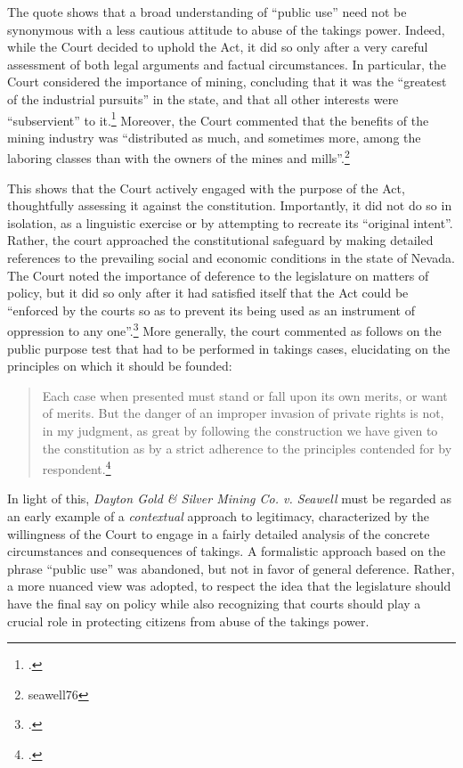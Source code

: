 The quote shows that a broad understanding of ``public use'' need not be synonymous with a less cautious attitude to abuse of the takings power. Indeed, while the Court decided to uphold the Act, it did so only after a very careful assessment of both legal arguments and factual circumstances. In particular, the Court considered the importance of mining, concluding that it was the ``greatest of the industrial pursuits'' in the state, and that all other interests were ``subservient'' to it.\footcite[409]{seawell76} Moreover, the Court commented that the benefits of the mining industry was ``distributed as much, and sometimes more, among the laboring classes than with the owners of the mines and mills''.\footnote[409]{seawell76}

This shows that the Court actively engaged with the purpose of the Act, thoughtfully assessing it against the constitution. Importantly, it did not do so in isolation, as a linguistic exercise or by attempting to recreate its ``original intent''. Rather, the court approached the constitutional safeguard by making detailed references to the prevailing social and economic conditions in the state of Nevada. The Court noted the importance of deference to the legislature on matters of policy, but it did so only after it had satisfied itself that the Act could be ``enforced by the courts so as to prevent its being used as an instrument of oppression to any one''.\footcite[412]{seawell76} More generally, the court commented as follows on the public purpose test that had to be performed in takings cases, elucidating on the principles on which it should be founded:

\begin{quote}
 Each case when presented must stand or fall upon its own merits, or want of merits. But the danger of an improper invasion of private rights is not, in my judgment, as great by following the construction we have given to the constitution as by a strict adherence to the principles contended for by respondent.\footcite[398]{seawell76}
\end{quote}

In light of this, {\it Dayton Gold \& Silver Mining Co. v. Seawell} must be regarded as an early example of a {\it contextual} approach to legitimacy, characterized by the willingness of the Court to engage in a fairly detailed analysis of the concrete circumstances and consequences of takings. A formalistic approach based on the phrase ``public use'' was abandoned, but not in favor of general deference. Rather, a more nuanced view was adopted, to respect the idea that the legislature should have the final say on policy while also recognizing that courts should play a crucial role in protecting citizens from abuse of the takings power. 

